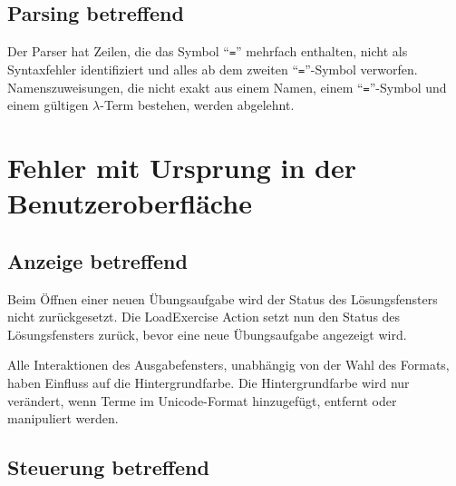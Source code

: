 \documentclass[parskip=full,11pt,openany]{scrreprt}
\begin{document}
\subsection{Parsing betreffend}
\begin{itemize}[itemsep=3ex]
	{Der Parser hat Zeilen, die das Symbol \enquote{\texttt{=}} mehrfach enthalten, nicht als Syntaxfehler identifiziert und
		alles ab dem zweiten \enquote{\texttt{=}}-Symbol verworfen.}
	{Namenszuweisungen, die nicht exakt aus einem Namen, einem \enquote{\texttt{=}}-Symbol und einem gültigen
		$\lambda$-Term bestehen, werden abgelehnt.}
\end{itemize}

\section{Fehler mit Ursprung in der Benutzeroberfläche}

\subsection{Anzeige betreffend}

\begin{itemize}[itemsep=3ex]
	
	{Beim Öffnen einer neuen Übungsaufgabe wird der Status des Lösungsfensters nicht zurückgesetzt.}
	{Die LoadExercise Action setzt nun den Status des Lösungsfensters zurück, bevor eine neue Übungsaufgabe angezeigt wird.}
	
	{Alle Interaktionen des Ausgabefensters, unabhängig von der Wahl des Formats, haben Einfluss auf die Hintergrundfarbe.}
	{Die Hintergrundfarbe wird nur verändert, wenn Terme im Unicode-Format hinzugefügt, entfernt oder manipuliert werden.}
\end{itemize}

\subsection{Steuerung betreffend}
\end{document}
